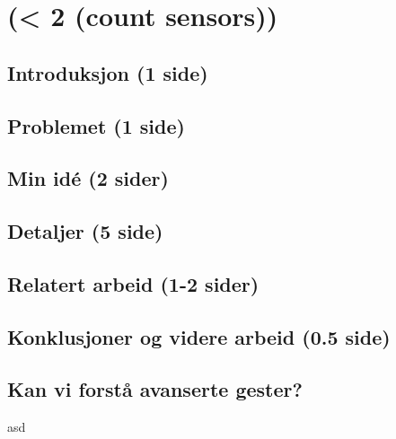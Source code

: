 \section{(< 2 (count sensors))}
\subsection{Introduksjon (1 side)}

\subsection{Problemet (1 side)}

\subsection{Min idé (2 sider)}

\subsection{Detaljer (5 side)}

\subsection{Relatert arbeid (1-2 sider)}

\subsection{Konklusjoner og videre arbeid (0.5 side)}

\subsection{Kan vi forstå avanserte gester?}
asd